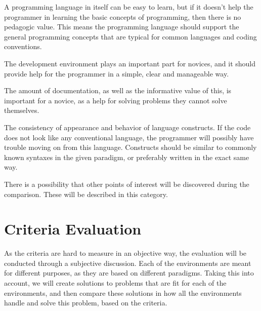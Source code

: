 \begin{description}[style=nextline]
\item[Pedagogic Value] A programming language in itself can be easy to learn, but if it doesn't help the programmer in learning the basic concepts of programming, then there is no pedagogic value. This means the programming language should support the general programming concepts that are typical for common languages and coding conventions.
\item[Environment] The development environment plays an important part for novices, and it should provide help for the programmer in a simple, clear and manageable way.
\item[Documentation] The amount of documentation, as well as the informative value of this, is important for a novice, as a help for solving problems they cannot solve themselves.
\item[Uniformity] The consistency of appearance and behavior of language constructs. If the code does not look like any conventional language, the programmer will possibly have trouble moving on from this language. Constructs should be similar to commonly known syntaxes in the given paradigm, or preferably written in the exact same way.
\item[Miscellaneous] There is a possibility that other points of interest will be discovered during the comparison. These will be described in this category.
\end{description}

\section{Criteria Evaluation}
As the criteria are hard to measure in an objective way, the evaluation will be conducted through a subjective discussion. Each of the environments are meant for different purposes, as they are based on different paradigms. Taking this into account, we will create solutions to problems that are fit for each of the environments, and then compare these solutions in how all the environments handle and solve this problem, based on the criteria.
